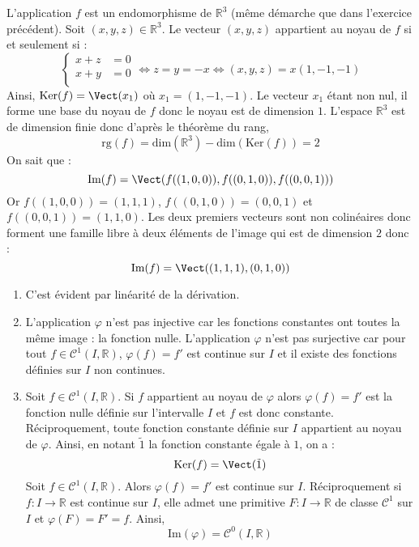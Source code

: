 \documentclass[a4paper,twoside,french,11pt]{VcCours}
\begin{document}
\begin{Exercice}{}\end{Exercice}L'application $f$ est un endomorphisme de $\mathbb{R}^3$ (même démarche que dans l'exercice précédent). Soit $(x,y,z) \in \mathbb{R}^3$. Le vecteur $(x,y,z)$ appartient au noyau de $f$ si et seulement si :
$$ \left\lbrace \begin{array}{rl}
x+z& =0 \\
x+y & = 0\\
\end{array}\right. 
\Longleftrightarrow z=y=-x \Longleftrightarrow (x,y,z) = x(1,-1,-1) $$
Ainsi, $\textrm{Ker}(f) = \Vect(x_1)$ où $x_1=(1,-1,-1)$. Le vecteur $x_1$ étant non nul, il forme une base du noyau de $f$ donc le noyau est de dimension $1$. L'espace $\mathbb{R}^3$ est de dimension finie donc d'après le théorème du rang,
$$ \textrm{rg}(f) = \textrm{dim}(\mathbb{R}^3) - \textrm{dim}(\textrm{Ker}(f)) = 2$$
On sait que :
$$ \textrm{Im}(f) = \Vect(f((1,0,0)), f((0,1,0)), f((0,0,1)))$$
Or $f((1,0,0))= (1,1,1)$, $f((0,1,0))= (0,0,1)$ et $f((0,0,1))=(1,1,0)$. Les deux premiers vecteurs sont non colinéaires donc forment une famille libre à deux éléments de l'image qui est de dimension $2$ donc :
$$ \textrm{Im}(f) = \Vect((1,1,1),(0,1,0))$$

\begin{Exercice}{}\end{Exercice}
\begin{enumerate}
\item C'est évident par linéarité de la dérivation.

\item L'application $\varphi$ n'est pas injective car les fonctions constantes ont toutes la même image : la fonction nulle. L'application $\varphi$ n'est pas surjective car pour tout $f \in \mathcal{C}^1(I, \mathbb{R})$, $\varphi(f)=f'$ est continue sur $I$ et il existe des fonctions définies sur $I$ non continues.
\item Soit $f \in \mathcal{C}^1(I, \mathbb{R})$. Si $f$ appartient au noyau de $\varphi$ alors $\varphi(f)=f'$ est la fonction nulle définie sur l'intervalle $I$ et $f$ est donc constante. Réciproquement, toute fonction constante définie sur $I$ appartient au noyau de $\varphi$. Ainsi, en notant $\tilde{1}$ la fonction constante égale à $1$, on a :
$$ \textrm{Ker}(f) = \Vect( \tilde{1} )$$
Soit $f \in \mathcal{C}^1(I, \mathbb{R})$. Alors $\varphi(f) = f'$ est continue sur $I$. Réciproquement si $f : I \rightarrow \mathbb{R}$ est continue sur $I$, elle admet une primitive $F : I \rightarrow \mathbb{R}$ de classe $\mathcal{C}^1$ sur $I$ et $\varphi(F)=F'=f$. Ainsi, 
$$  \textrm{Im}(\varphi) = \mathcal{C}^0(I, \mathbb{R})$$
\end{enumerate}
\end{document}
